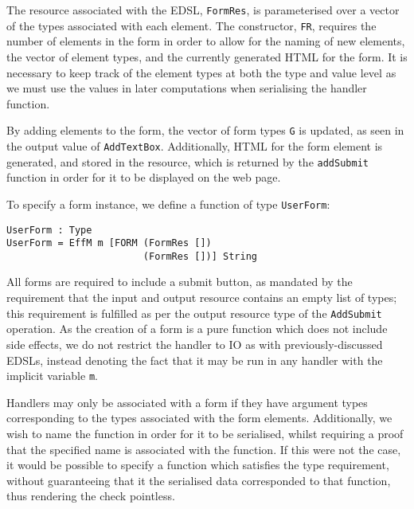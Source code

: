 \documentclass[preprint]{sigplanconf}
\begin{document}
The resource associated with the EDSL, \texttt{FormRes}, is parameterised over a vector of the types associated with each element. The constructor, \texttt{FR}, requires the number of elements in the form in order to allow for the naming of new elements, the vector of element types, and the currently generated HTML for the form. It is necessary to keep track of the element types at both the type and value level as we must use the values in later computations when serialising the handler function. 

By adding elements to the form, the vector of form types \texttt{G} is updated, as seen in the output value of \texttt{AddTextBox}. Additionally, HTML for the form element is generated, and stored in the resource, which is returned by the \texttt{addSubmit} function in order for it to be displayed on the web page.

To specify a form instance, we define a function of type \texttt{UserForm}:
{\small
\begin{verbatim}
UserForm : Type
UserForm = EffM m [FORM (FormRes []) 
                        (FormRes [])] String
\end{verbatim}}
All forms are required to include a submit button, as mandated by the requirement that the input and output resource contains an empty list of types; this requirement is fulfilled as per the output resource type of the \texttt{AddSubmit} operation. As the creation of a form is a pure function which does not include side effects, we do not restrict the handler to IO as with previously-discussed EDSLs, instead denoting the fact that it may be run in any handler with the implicit variable \texttt{m}.

Handlers may only be associated with a form if they have argument types corresponding to the types associated with the form elements. Additionally, we wish to name the function in order for it to be serialised, whilst requiring a proof that the specified name is associated with the function. If this were not the case, it would be possible to specify a function which satisfies the type requirement, without guaranteeing that it the serialised data corresponded to that function, thus rendering the check pointless. 
\end{document}

